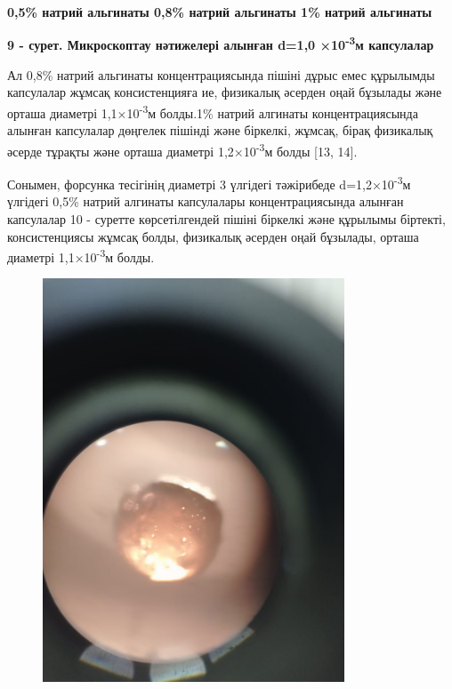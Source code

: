 {\bfseries 0,5\% натрий альгинаты 0,8\% натрий альгинаты 1\% натрий альгинаты}

{\bfseries 9 - сурет. Микроскоптау нәтижелері алынған d=1,0 ×10\textsuperscript{-3}м капсулалар}

Ал 0,8\% натрий альгинаты концентрациясында пішіні дұрыс емес құрылымды
капсулалар жұмсақ консистенцияға ие, физикалық әсерден оңай бұзылады
және орташа диаметрі 1,1×10\textsuperscript{-3}м болды.1\% натрий
алгинаты концентрациясында алынған капсулалар дөңгелек пішінді және
біркелкі, жұмсақ, бірақ физикалық әсерде тұрақты және орташа диаметрі
1,2×10\textsuperscript{-3}м болды {[}13, 14{]}.

Сонымен, форсунка тесігінің диаметрі 3 үлгідегі тәжірибеде
d=1,2×10\textsuperscript{-3}м үлгідегі 0,5\% натрий алгинаты капсулалары
концентрациясында алынған капсулалар 10 - суретте көрсетілгендей пішіні
біркелкі және құрылымы біртекті, консистенциясы жұмсақ болды, физикалық
әсерден оңай бұзылады, орташа диаметрі 1,1×10\textsuperscript{-3}м
болды.


\begin{figure}[H]
	\centering
	\includegraphics[width=0.8\textwidth]{media/pish/image41}
	\caption*{}
\end{figure}


